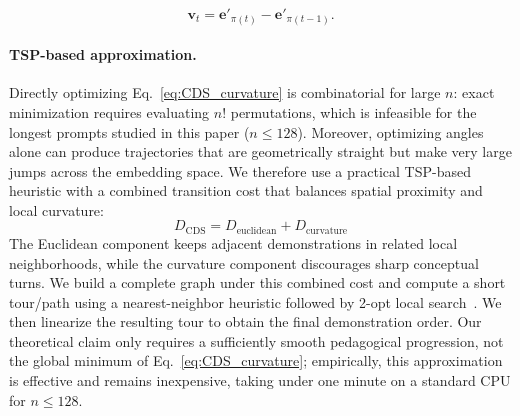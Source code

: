 \documentclass{llmxive}
\begin{document}
\begin{equation}
    \mathbf{v}_t = \mathbf{e'}_{\pi(t)}-\mathbf{e'}_{\pi(t-1)}.
\end{equation}

\paragraph{TSP-based approximation.}
Directly optimizing Eq.~\eqref{eq:CDS_curvature} is combinatorial for large $n$: exact minimization requires evaluating $n!$ permutations, which is infeasible for the longest prompts studied in this paper ($n\le128$).
Moreover, optimizing angles alone can produce trajectories that are geometrically straight but make very large jumps across the embedding space.
We therefore use a practical TSP-based heuristic with a combined transition cost that balances spatial proximity and local curvature:
\vspace{-0.5mm}
\begin{equation*}
D_{\mathrm{CDS}} = D_{\mathrm{euclidean}} + D_{\mathrm{curvature}}
\end{equation*}
\vspace{-0.5mm}
The Euclidean component keeps adjacent demonstrations in related local neighborhoods, while the curvature component discourages sharp conceptual turns.
We build a complete graph under this combined cost and compute a short tour/path using a nearest-neighbor heuristic followed by 2-opt local search~\cite{tsp}.
We then linearize the resulting tour to obtain the final demonstration order.
Our theoretical claim only requires a sufficiently smooth pedagogical progression, not the global minimum of Eq.~\eqref{eq:CDS_curvature}; empirically, this approximation is effective and remains inexpensive, taking under one minute on a standard CPU for $n\le128$.
\end{document}
